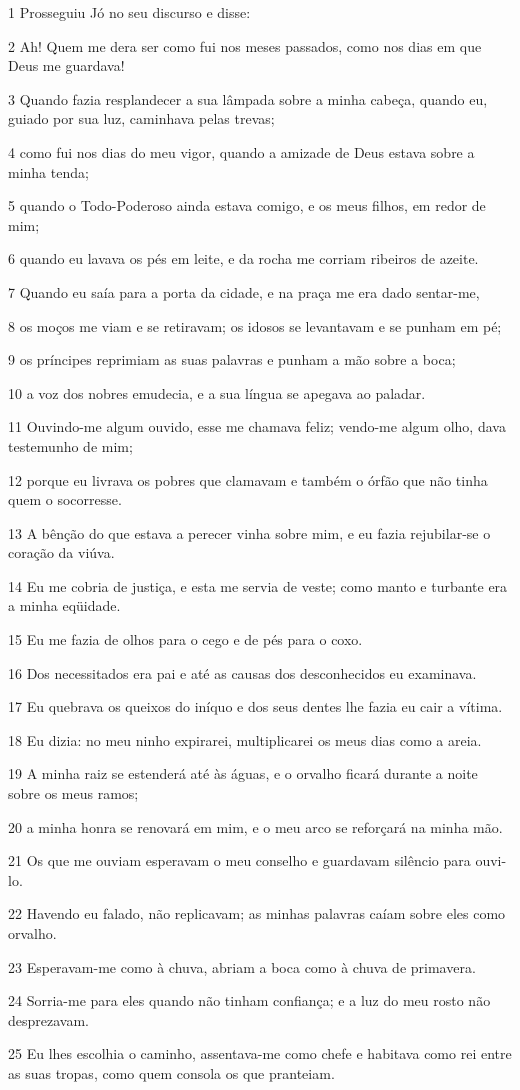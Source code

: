 \par 1 Prosseguiu Jó no seu discurso e disse:
\par 2 Ah! Quem me dera ser como fui nos meses passados, como nos dias em que Deus me guardava!
\par 3 Quando fazia resplandecer a sua lâmpada sobre a minha cabeça, quando eu, guiado por sua luz, caminhava pelas trevas;
\par 4 como fui nos dias do meu vigor, quando a amizade de Deus estava sobre a minha tenda;
\par 5 quando o Todo-Poderoso ainda estava comigo, e os meus filhos, em redor de mim;
\par 6 quando eu lavava os pés em leite, e da rocha me corriam ribeiros de azeite.
\par 7 Quando eu saía para a porta da cidade, e na praça me era dado sentar-me,
\par 8 os moços me viam e se retiravam; os idosos se levantavam e se punham em pé;
\par 9 os príncipes reprimiam as suas palavras e punham a mão sobre a boca;
\par 10 a voz dos nobres emudecia, e a sua língua se apegava ao paladar.
\par 11 Ouvindo-me algum ouvido, esse me chamava feliz; vendo-me algum olho, dava testemunho de mim;
\par 12 porque eu livrava os pobres que clamavam e também o órfão que não tinha quem o socorresse.
\par 13 A bênção do que estava a perecer vinha sobre mim, e eu fazia rejubilar-se o coração da viúva.
\par 14 Eu me cobria de justiça, e esta me servia de veste; como manto e turbante era a minha eqüidade.
\par 15 Eu me fazia de olhos para o cego e de pés para o coxo.
\par 16 Dos necessitados era pai e até as causas dos desconhecidos eu examinava.
\par 17 Eu quebrava os queixos do iníquo e dos seus dentes lhe fazia eu cair a vítima.
\par 18 Eu dizia: no meu ninho expirarei, multiplicarei os meus dias como a areia.
\par 19 A minha raiz se estenderá até às águas, e o orvalho ficará durante a noite sobre os meus ramos;
\par 20 a minha honra se renovará em mim, e o meu arco se reforçará na minha mão.
\par 21 Os que me ouviam esperavam o meu conselho e guardavam silêncio para ouvi-lo.
\par 22 Havendo eu falado, não replicavam; as minhas palavras caíam sobre eles como orvalho.
\par 23 Esperavam-me como à chuva, abriam a boca como à chuva de primavera.
\par 24 Sorria-me para eles quando não tinham confiança; e a luz do meu rosto não desprezavam.
\par 25 Eu lhes escolhia o caminho, assentava-me como chefe e habitava como rei entre as suas tropas, como quem consola os que pranteiam.

